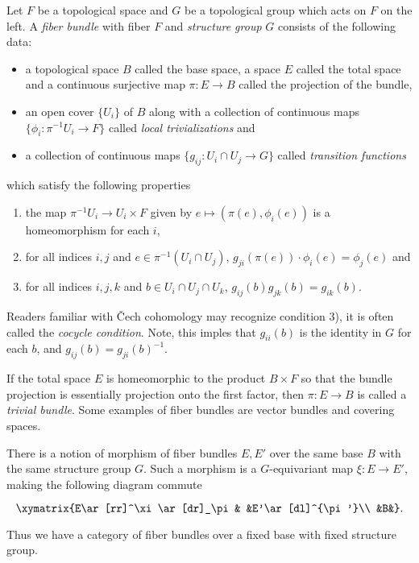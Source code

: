 \documentclass[12pt]{article}
\begin{document}
Let $F$ be a topological space and $G$ be a topological group which acts on $F$ on the left. A \emph{fiber bundle} with fiber $F$ and \emph{structure group} $G$ consists of the following data:
\begin{itemize}
\item a topological space $B$ called the base space, a space $E$ called the total space and a continuous surjective map $\pi:E \to B$ called the projection of the bundle,
\item an open cover $\{U_i\}$ of $B$ along with a collection of continuous maps
$\{\phi_i: \pi^{-1}U_i \to F\}$ called \emph{local trivializations} and
\item a collection of continuous maps $\{g_{ij}: U_i \cap U_j \to G\}$ called \emph{transition functions}
\end{itemize}
which satisfy the following properties
\begin{enumerate}
\item the map $\pi^{-1}U_i \to U_i \times F$ given by $e \mapsto (\pi(e),\phi_i(e))$ is a homeomorphism for each $i$,
\item for all indices $i,j$ and $e \in \pi^{-1}(U_i \cap U_j)$, $g_{ji}(\pi(e))\cdot \phi_i(e) = \phi_j(e)$ and
\item for all indices $i,j,k$ and $b \in U_i \cap U_j \cap U_k$, $g_{ij}(b)g_{jk}(b) = g_{ik}(b)$.
\end{enumerate}

Readers familiar with \v{C}ech cohomology may recognize condition 3), it is often called the \emph{cocycle condition}. Note, this imples that $g_{ii}(b)$ is the identity in $G$ for each $b$, and $g_{ij}(b) = g_{ji}(b)^{-1}$. 

If the total space $E$ is homeomorphic to the product $B \times F$ so that the bundle projection is essentially projection onto the first factor, then $\pi : E \to B$ is called a \emph{trivial bundle}. Some examples of fiber bundles are vector bundles and covering spaces.

There is a notion of morphism of fiber bundles $E,E'$ over the same base $B$ with the same structure group $G$.  Such a morphism is a $G$-equivariant map $\xi:E\to E'$, making the following diagram commute

$$\xymatrix{E\ar[rr]^\xi\ar[dr]_\pi& &E'\ar[dl]^{\pi'}\\ &B&}.$$

Thus we have a category of fiber bundles over a fixed base with fixed structure group.
\end{document}
